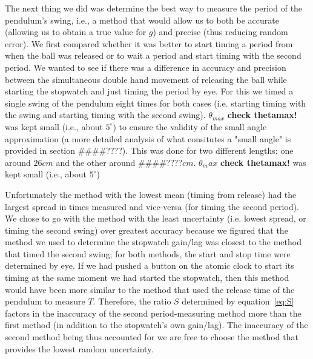 \documentclass[iop]{emulateapj}
\def\g{$g$}
\def\T{$T$}
\def\fillin{\#\#\#\#????}
\def\deg{^{\circ}}
\begin{document}
The next thing we did was determine the best way to measure the period of the 
pendulum's swing, i.e., a method that would allow us to both be accurate 
(allowing us to obtain a true value for \g) and precise (thus reducing random 
error). We first compared whether it was better to start timing a period from 
when the ball was released or to wait a period and start timing with the 
second period.  We wanted to see if there was a difference in accuracy and 
precision between the simultaneous double hand movement of releasing the ball 
while starting the stopwatch and just timing the period by eye. For this we 
timed a single swing of the pendulum eight times for both cases (i.e. starting 
timing with the swing and starting timing with the second swing). $\theta_{max}$ 
{\bf check thetamax!} was kept small (i.e., about $5\deg$) to ensure the 
validity of the small angle approximation (a more detailed analysis of what 
consitutes a "small angle" is provided in section \fillin). This was done 
for two different lengths: one around $26cm$ and the other around \fillin$cm$. 
$\theta_max$ {\bf check thetamax!} was kept small (i.e., about $5\deg$) 

Unfortunately the method with the lowest 
mean (timing from release) had the largest spread in times measured and 
vice-versa (for timing the second period). We chose to go 
with the method with the least uncertainty (i.e. lowest spread, or timing the 
second swing) over greatest accuracy because we figured that the method we 
used to determine the stopwatch gain/lag was closest to the method that timed 
the second swing; for both methods, the start and stop time were determined by 
eye.  If we had pushed a button on the atomic clock to start its timing at the 
same moment we had started the stopwatch, then this method would have been 
more similar to the method that used the release time of the pendulum to 
measure \T.  Therefore, the ratio $S$ determined by equation~\ref{eq:S} 
factors in the inaccuracy of the second period-measuring method more 
than the first method (in addition to the stopwatch's own gain/lag). The 
inaccuracy of the second method being thus accounted for we are free to choose 
the method that provides the lowest random uncertainty. 
\end{document}
